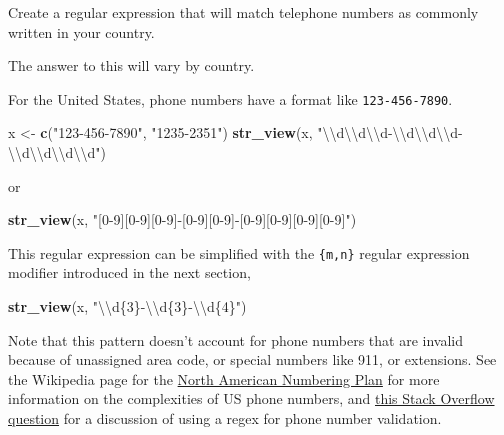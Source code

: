 \documentclass[]{book}
\newenvironment{Shaded}{\begin{snugshade}}{\end{snugshade}}
\newcommand{\CharTok}[1]{\textcolor[rgb]{0.31,0.60,0.02}{#1}}
\newcommand{\KeywordTok}[1]{\textcolor[rgb]{0.13,0.29,0.53}{\textbf{#1}}}
\newcommand{\NormalTok}[1]{#1}
\newcommand{\StringTok}[1]{\textcolor[rgb]{0.31,0.60,0.02}{#1}}
\theoremstyle{plain}
\theoremstyle{remark}
\begin{document}
Create a regular expression that will match telephone numbers as commonly written in your country.

The answer to this will vary by country.

For the United States, phone numbers have a format like \texttt{123-456-7890}.

\begin{Shaded}
\begin{Highlighting}[]
\NormalTok{x <-}\StringTok{ }\KeywordTok{c}\NormalTok{(}\StringTok{"123-456-7890"}\NormalTok{, }\StringTok{"1235-2351"}\NormalTok{)}
\KeywordTok{str_view}\NormalTok{(x, }\StringTok{"}\CharTok{\textbackslash{}\textbackslash{}}\StringTok{d}\CharTok{\textbackslash{}\textbackslash{}}\StringTok{d}\CharTok{\textbackslash{}\textbackslash{}}\StringTok{d-}\CharTok{\textbackslash{}\textbackslash{}}\StringTok{d}\CharTok{\textbackslash{}\textbackslash{}}\StringTok{d}\CharTok{\textbackslash{}\textbackslash{}}\StringTok{d-}\CharTok{\textbackslash{}\textbackslash{}}\StringTok{d}\CharTok{\textbackslash{}\textbackslash{}}\StringTok{d}\CharTok{\textbackslash{}\textbackslash{}}\StringTok{d}\CharTok{\textbackslash{}\textbackslash{}}\StringTok{d"}\NormalTok{)}
\end{Highlighting}
\end{Shaded}

or

\begin{Shaded}
\begin{Highlighting}[]
\KeywordTok{str_view}\NormalTok{(x, }\StringTok{"[0-9][0-9][0-9]-[0-9][0-9]-[0-9][0-9][0-9][0-9]"}\NormalTok{)}
\end{Highlighting}
\end{Shaded}

This regular expression can be simplified with the \texttt{\{m,n\}} regular expression modifier introduced in the next section,

\begin{Shaded}
\begin{Highlighting}[]
\KeywordTok{str_view}\NormalTok{(x, }\StringTok{"}\CharTok{\textbackslash{}\textbackslash{}}\StringTok{d\{3\}-}\CharTok{\textbackslash{}\textbackslash{}}\StringTok{d\{3\}-}\CharTok{\textbackslash{}\textbackslash{}}\StringTok{d\{4\}"}\NormalTok{)}
\end{Highlighting}
\end{Shaded}

Note that this pattern doesn't account for phone numbers that are invalid
because of unassigned area code, or special numbers like 911, or extensions.
See the Wikipedia page for the \href{https://en.wikipedia.org/wiki/North_American_Numbering_Plan}{North American Numbering
Plan} for more
information on the complexities of US phone numbers, and \href{http://stackoverflow.com/questions/123559/a-comprehensive-regex-for-phone-number-validation}{this Stack Overflow
question}
for a discussion of using a regex for phone number validation.
\end{document}

